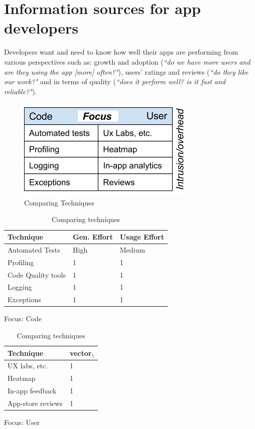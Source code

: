 \section{Information sources for app developers}
Developers want and need to know how well their apps are performing from various perspectives such as: growth and adoption (\emph{``do we have more users and are they using the app [more] often?"}), users' ratings and reviews (\emph{``do they like our work?"} and in terms of quality (\emph{``does it perform well? is it fast and reliable?"}). 

\begin{figure}[htbp!]
    \centering
    \includegraphics{images/ComparingTechniquesRHS.png}
    \caption{Comparing Techniques}
    \label{fig:comparing_techniques}
\end{figure}

\begin{table}[htbp!]
    \parbox{.40\linewidth}{
        \centering
        \small
        \begin{tabular}{lll}
            Technique  & Gen. Effort & Usage Effort  \\
            \hline
            Automated Tests  & High  & Medium \\ 
            Profiling   & 1 & 1 \\
            Code Quality tools & 1 & 1 \\
            Logging   & 1 & 1 \\ 
            Exceptions  & 1 & 1 \\ 

        \end{tabular}
        \caption{Focus: Code \label{HRVtable}}
    }
    \hfill
    \parbox{.40\linewidth}{
        \centering
        \small
        \begin{tabular}{ll}
            Technique & vector$_1$  \\
            \hline
            UX labs, etc. & 1  \\ 
            Heatmap & 1  \\ 
            In-app feedback & 1  \\ 
            App-store reviews & 1  \\
        \end{tabular}
        \caption{Focus: User \label{BACtable}}}
    \caption{Comparing techniques}
\end{table}

